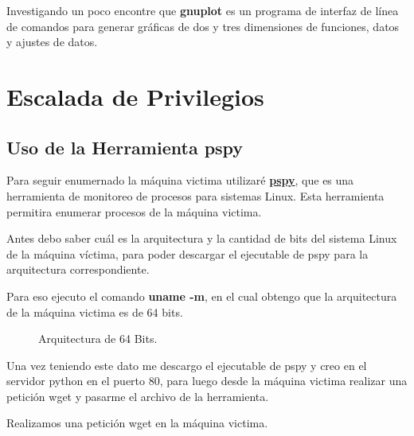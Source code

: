 \documentclass[a4paper]{article} %
\begin{document}
    Investigando un poco encontre que \textbf{gnuplot} es un programa de interfaz de línea de comandos para generar gráficas de dos y tres dimensiones de funciones, datos y ajustes de datos.

\vspace{6cm}

\section{Escalada de Privilegios}

    \subsection{Uso de la Herramienta pspy}

    \vspace{0.2cm}

    Para seguir enumernado la máquina victima utilizaré \href{https://github.com/DominicBreuker/pspy}{\textbf{\color{black}pspy}}, que es una herramienta de monitoreo de procesos para sistemas Linux. Esta herramienta permitira enumerar procesos de la máquina victima.

    Antes debo saber cuál es la arquitectura y la cantidad de bits del sistema Linux de la máquina víctima, para poder descargar el ejecutable de pspy para la arquitectura correspondiente.

    Para eso ejecuto el comando \textbf{uname -m}, en el cual obtengo que la arquitectura de la máquina victima es de 64 bits.

    \begin{figure}[h] %
        \begin{center}
        \setlength{\fboxsep}{0.2em} %
        \end{center}
        \captionsetup{labelfont=bf} %
        \caption{Arquitectura de 64 Bits.}
    \end{figure}

    Una vez teniendo este dato me descargo el ejecutable de pspy y creo en el servidor python en el puerto 80, para luego desde la máquina victima realizar una petición wget y pasarme el archivo de la herramienta.

    Realizamos una petición wget en la máquina victima.
\end{document}
